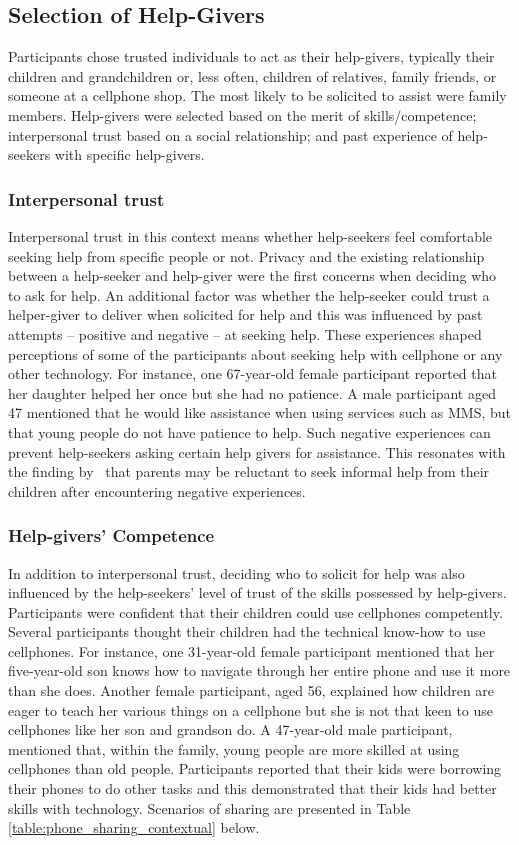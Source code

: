 \subsection{Selection of Help-Givers}
Participants chose trusted individuals to act as their help-givers, typically their children and grandchildren or, less often, children of relatives, family friends, or someone at a cellphone shop. The most likely to be solicited to assist were family members. Help-givers were selected based on the merit of skills/competence; interpersonal trust based on a social relationship; and past experience of help-seekers with specific help-givers.
\subsubsection*{Interpersonal trust}
Interpersonal trust in this context means whether help-seekers feel comfortable seeking help from specific people or not. Privacy and the existing relationship between a help-seeker and help-giver were the first concerns when deciding who to ask for help. An additional factor was whether the help-seeker could trust a helper-giver to deliver when solicited for help and this was influenced by past attempts -- positive and negative -- at seeking help. These experiences shaped perceptions of some of the participants about seeking help with cellphone or any other technology. For instance, one  67-year-old female participant reported that her daughter helped her once but she had no patience. A male participant aged 47 mentioned that he would like assistance when using services such as MMS, but that young people do not have patience to help. Such negative experiences can prevent help-seekers asking certain help givers for assistance. This resonates with the finding by~\cite{kiesler:twi} that parents may be reluctant to seek informal help from their children after encountering negative experiences.
\subsubsection*{Help-givers' Competence}
In addition to interpersonal trust, deciding who to solicit for help was also influenced by the help-seekers' level of trust of the skills possessed by help-givers. Participants were confident that their children could use cellphones competently. Several participants thought their children had the technical know-how to use cellphones. For instance, one 31-year-old female participant mentioned that her five-year-old son knows how to navigate through her entire phone and use it more than she does. Another female participant, aged 56, explained how children are eager to teach her various things on a cellphone but she is not that keen to use cellphones like her son and grandson do. A 47-year-old male participant, mentioned that, within the family, young people are more skilled at using cellphones than old people.
Participants reported that their kids were borrowing their phones to do other tasks and this demonstrated that their kids had better skills with technology. Scenarios of sharing are presented in Table \ref{table:phone_sharing_contextual} below. 

